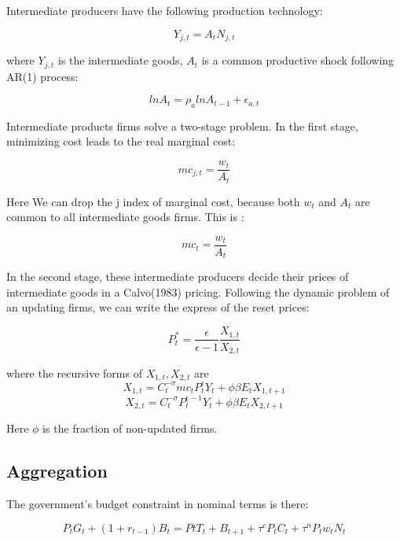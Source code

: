 \documentclass[cn,10pt,math=newtx,citestyle=gb7714-2015,bibstyle=gb7714-2015]{elegantbook}
\begin{document}
	Intermediate producers have the following production technology:
	
	\begin{equation}
		Y_{j,t}=A_tN_{j,t}
	\end{equation}
	
	where $Y_{j,t}$ is the intermediate goods, $A_t$ is a common productive shock following AR(1) process:
	
	\begin{equation}
		lnA_t=\rho_a lnA_{t-1}+\epsilon_{a,t}
	\end{equation}
	
	Intermediate products firms solve a two-stage problem. In the first stage, minimizing cost leads to the real marginal cost:
	
	$$mc_{j,t}=\frac{w_t}{A_t}$$
	
	Here We can drop the j index of marginal cost, because both $w_t$ and $A_t$ are common to all intermediate goods firms. This is :
	
	\begin{equation}
		mc_{t}=\frac{w_t}{A_t}
	\end{equation}
	
	In the second stage, these intermediate producers decide their prices of intermediate goods in a Calvo(1983) pricing. Following the dynamic problem of an updating firms, we can write the express of the reset prices:
	
	\begin{equation}
		P_t^{*}=\frac{\epsilon}{\epsilon-1}\frac{X_{1,t}}{X_{2,t}}
	\end{equation}
	
	where the recursive forms of $X_{1,t}, X_{2,t}$ are
	\begin{equation}
		X_{1,t}=C_t^{-\sigma}mc_tP_t^{\epsilon}Y_t+\phi \beta E_tX_{1,t+1}
	\end{equation}
	\begin{equation}
		X_{2,t}=C_t^{-\sigma}P_t^{\epsilon-1}Y_t+\phi \beta E_tX_{2,t+1}
	\end{equation}
	
	Here $\phi$ is the fraction of non-updated firms.
	
	\subsection{Aggregation}
	
	The government's budget constraint in nominal terms is there:
	
	$$P_tG_t+(1+r_{t-1})B_t=PtT_t+B_{t+1}+\tau^cP_tC_t+\tau^nP_tw_tN_t$$
	
\end{document}
